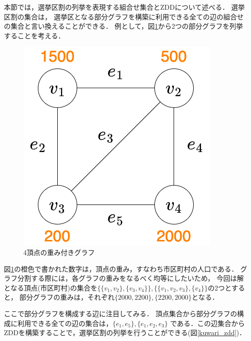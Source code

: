 本節では，選挙区割の列挙を表現する組合せ集合とZDDについて述べる．
選挙区割の集合は，
選挙区となる部分グラフを構築に利用できる全ての辺の組合せの集合と言い換えることができる．
例として，図\ref{kuwari}から2つの部分グラフを列挙することを考える．

\begin{figure}[htbp]
  \centering
  \includegraphics[scale=0.3]{img/kuwari.png}
  \caption{4頂点の重み付きグラフ}
  \label{kuwari}
\end{figure}

図\ref{kuwari}の橙色で書かれた数字は，頂点の重み，すなわち市区町村の人口である．
グラフ分割する際には，各グラフの重みをなるべく均等にしたいため，
今回は解となる頂点(市区町村)の集合を$\{\{v_1,v_2\},\{v_3,v_4\}\},
\{\{v_1,v_2,v_3\}, \{v_4\}\}$の2つとすると，
部分グラフの重みは，それぞれ$\{2000, 2200\},\{2200, 2000\}$となる．

ここで部分グラフを構成する辺に注目してみる．
頂点集合から部分グラフの構成に利用できる全ての辺の集合は，$\{e_1, e_5\}, \{e_1,e_2,e_3\}$
である．この辺集合からZDDを構築することで，選挙区割の列挙を行うことができる(図\ref{kuwari_zdd})．


